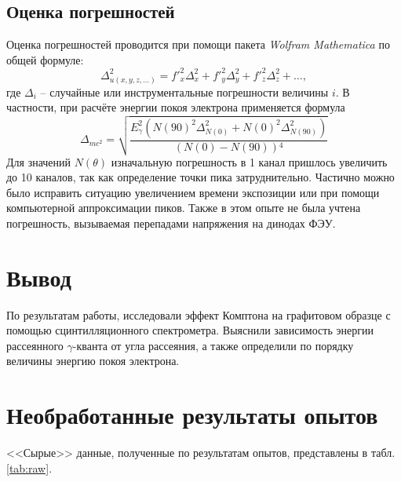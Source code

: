 \documentclass[a4paper]{article}
\newcommand{\gmm}{$\gamma $}
\begin{document}
	\subsection{Оценка погрешностей}
	Оценка погрешностей проводится при помощи пакета \emph{Wolfram Mathematica} по общей формуле:
	\begin{equation}\label{eq:погрешности}
		\Delta_{u(x, y, z, \ldots)}^2 = f'^2_{x} \Delta_x^2 + f'^2_y \Delta_y^2 + f'^2_z \Delta_z^2 + \ldots,
	\end{equation}
	где $ \Delta_i $ -- случайные или инструментальные погрешности величины $ i $.
	В частности, при расчёте энергии покоя электрона применяется формула
	\begin{equation*}\label{key}
		\Delta_{m c^2} = \sqrt{\frac{E_\gamma^2 \left(N(90)^2 \Delta _{N(0)}^2+N(0)^2 \Delta _{N(90)}^2\right)}{\left(N(0)-N(90)\right){}^4}}
	\end{equation*}
	Для значений $ N(\theta) $ изначальную погрешность в 1 канал пришлось увеличить до 10 каналов, так как определение точки пика затруднительно. Частично можно было исправить ситуацию увеличением времени экспозиции или при помощи компьютерной аппроксимации пиков. Также в этом опыте не была учтена погрешность, вызываемая перепадами напряжения на динодах ФЭУ.
	
	\section{Вывод}
	
	По результатам работы, исследовали эффект Комптона на графитовом образце с помощью сцинтилляционного спектрометра. Выяснили зависимость  энергии рассеянного \gmm-кванта от угла рассеяния, а также определили по порядку величины энергию покоя электрона.
			\newpage
	\appendix
	\section{Необработанные результаты опытов}
	
	<<Сырые>> данные, полученные по результатам опытов, представлены в табл. \ref{tab:raw}.
		
\end{document}
